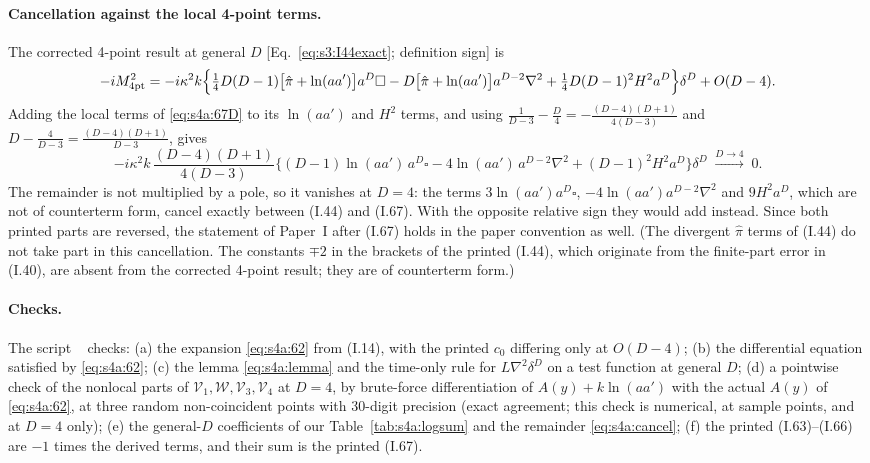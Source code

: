 \documentclass[aps,prd,onecolumn,10pt,nofootinbib,floatfix]{revtex4-2}
\newcommand{\PI}{Paper~I}
\newcommand{\eqI}[1]{(I.#1)}
\newcommand{\pihat}{\hat\pi}
\begin{document}
\paragraph*{Cancellation against the local 4-point terms.}
The corrected 4-point result at general $D$ [Eq.~\eqref{eq:s3:I44exact}; definition sign] is
\begin{equation}
-iM^2_{\rm 4pt}=-i\kappa^2k\Big\{\tfrac14D(D-1)\big[\pihat+\ln(aa')\big]a^D\square-D\big[\pihat+\ln(aa')\big]a^{D-2}\nabla^2
+\tfrac14D(D-1)^2H^2a^D\Big\}\delta^D+O(D-4).
\label{eq:s4a:44D}
\end{equation}
Adding the local terms of \eqref{eq:s4a:67D} to its $\ln(aa')$ and $H^2$ terms, and using
$\frac{1}{D-3}-\frac D4=-\frac{(D-4)(D+1)}{4(D-3)}$ and $D-\frac{4}{D-3}=\frac{(D-4)(D+1)}{D-3}$, gives
\begin{equation}
-i\kappa^2k\,\frac{(D-4)(D+1)}{4(D-3)}\Big\{(D-1)\ln(aa')\,a^D\square-4\ln(aa')\,a^{D-2}\nabla^2+(D-1)^2H^2a^D\Big\}\delta^D
\;\xrightarrow{D\to4}\;0 .
\label{eq:s4a:cancel}
\end{equation}
The remainder is not multiplied by a pole, so it vanishes at $D=4$: the terms
$3\ln(aa')a^D\square$, $-4\ln(aa')a^{D-2}\nabla^2$ and $9H^2a^D$, which are not of counterterm form, cancel
exactly between \eqI{44} and \eqI{67}. With the opposite relative sign they would add instead. Since
both printed parts are reversed, the statement of \PI{} after \eqI{67} holds in the paper convention
as well. (The divergent $\pihat$ terms of \eqI{44} do not take part in this cancellation. The constants
$\mp2$ in the brackets of the printed \eqI{44}, which originate from the finite-part error in \eqI{40},
are absent from the corrected 4-point result; they are of counterterm form.)

\paragraph*{Checks.}
The script ~\cite{ref:repo} checks:
(a) the expansion \eqref{eq:s4a:62} from \eqI{14}, with the printed $c_0$ differing only at $O(D-4)$;
(b) the differential equation satisfied by \eqref{eq:s4a:62};
(c) the lemma \eqref{eq:s4a:lemma} and the time-only rule for $L\nabla^2\delta^D$ on a test function at
general $D$;
(d) a pointwise check of the nonlocal parts of $\mathcal V_1,\mathcal W,\mathcal V_3,\mathcal V_4$ at $D=4$,
by brute-force differentiation of $A(y)+k\ln(aa')$ with the actual $A(y)$ of \eqref{eq:s4a:62}, at three
random non-coincident points with 30-digit precision (exact agreement; this check is numerical, at
sample points, and at $D=4$ only);
(e) the general-$D$ coefficients of our Table~\ref{tab:s4a:logsum} and the remainder \eqref{eq:s4a:cancel};
(f) the printed \eqI{63}--\eqI{66} are $-1$ times the derived terms, and their sum is the printed \eqI{67}.
\end{document}
